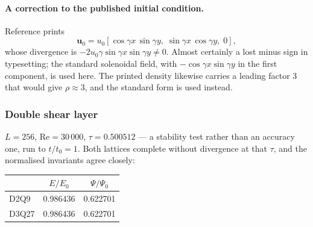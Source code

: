\documentclass[11pt,a4paper]{article}
\newcommand{\uu}{\bm{u}}
\begin{document}
\paragraph{A correction to the published initial condition.} Reference
\cite{derosis2020} prints
\begin{equation*}
  \uu_0 = u_0[\cos\gamma x\,\sin\gamma y,\;\sin\gamma x\,\cos\gamma y,\;0],
\end{equation*}
whose divergence is $-2u_0\gamma\sin\gamma x\sin\gamma y \neq 0$. Almost certainly a lost minus
sign in typesetting; the standard solenoidal field, with $-\cos\gamma x
\sin\gamma y$ in the first component, is used here. The printed density
likewise carries a leading factor $3$ that would give $\rho\approx 3$, and the
standard form is used instead.

\subsubsection{Double shear layer}

$L=256$, $\mathrm{Re}=30\,000$, $\tau=0.500512$ --- a stability test rather than
an accuracy one, run to $t/t_0=1$. Both lattices complete without
divergence at that $\tau$, and the normalised invariants agree closely:

\begin{center}\small
\begin{tabular}{lcc}
\toprule
 & $E/E_0$ & $\Psi/\Psi_0$ \\
\midrule
D2Q9  & 0.986436 & 0.622701 \\
D3Q27 & 0.986436 & 0.622701 \\
\bottomrule
\end{tabular}
\end{center}
\end{document}
